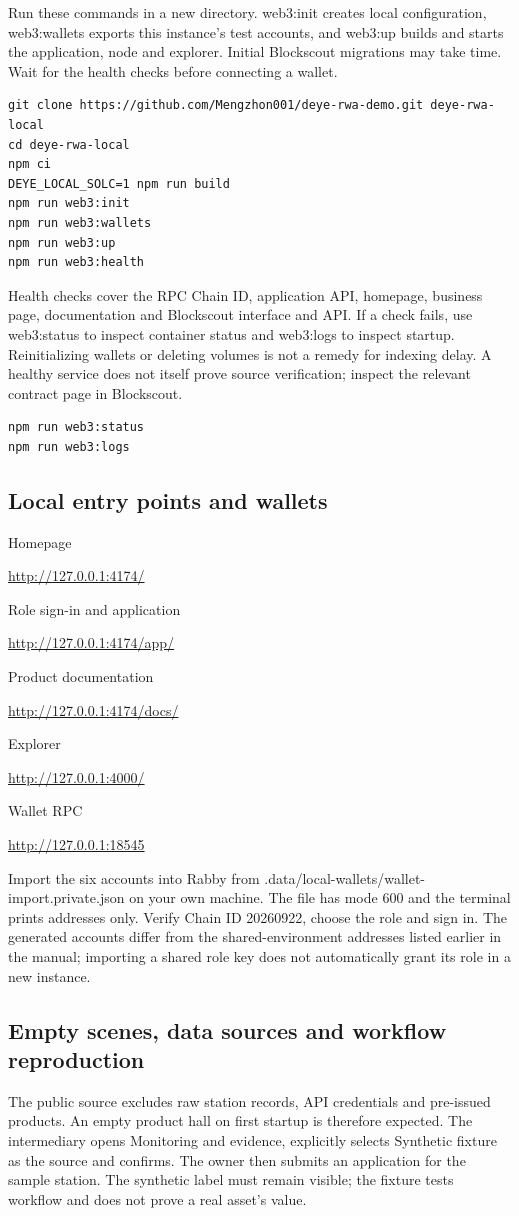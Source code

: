 \documentclass[12pt,a4paper]{article}
\begin{document}
Run these commands in a new directory. web3:init creates local configuration, web3:wallets exports this instance's test accounts, and web3:up builds and starts the application, node and explorer. Initial Blockscout migrations may take time. Wait for the health checks before connecting a wallet.

\begin{verbatim}
git clone https://github.com/Mengzhon001/deye-rwa-demo.git deye-rwa-local
cd deye-rwa-local
npm ci
DEYE_LOCAL_SOLC=1 npm run build
npm run web3:init
npm run web3:wallets
npm run web3:up
npm run web3:health
\end{verbatim}
Health checks cover the RPC Chain ID, application API, homepage, business page, documentation and Blockscout interface and API. If a check fails, use web3:status to inspect container status and web3:logs to inspect startup. Reinitializing wallets or deleting volumes is not a remedy for indexing delay. A healthy service does not itself prove source verification; inspect the relevant contract page in Blockscout.

\begin{verbatim}
npm run web3:status
npm run web3:logs
\end{verbatim}
\subsection{Local entry points and wallets}
Homepage\par\url{http://127.0.0.1:4174/}\par
Role sign-in and application\par\url{http://127.0.0.1:4174/app/}\par
Product documentation\par\url{http://127.0.0.1:4174/docs/}\par
Explorer\par\url{http://127.0.0.1:4000/}\par
Wallet RPC\par\url{http://127.0.0.1:18545}\par
Import the six accounts into Rabby from .data/local-wallets/wallet-import.private.json on your own machine. The file has mode 600 and the terminal prints addresses only. Verify Chain ID 20260922, choose the role and sign in. The generated accounts differ from the shared-environment addresses listed earlier in the manual; importing a shared role key does not automatically grant its role in a new instance.

\subsection{Empty scenes, data sources and workflow reproduction}
The public source excludes raw station records, API credentials and pre-issued products. An empty product hall on first startup is therefore expected. The intermediary opens Monitoring and evidence, explicitly selects Synthetic fixture as the source and confirms. The owner then submits an application for the sample station. The synthetic label must remain visible; the fixture tests workflow and does not prove a real asset's value.
\end{document}
